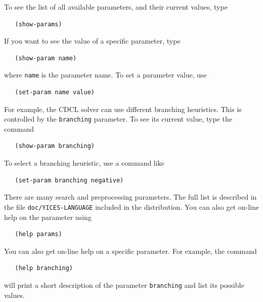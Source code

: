 \documentclass[11pt,twoside,fleqn,openright,titlepage]{cslreport}
\begin{document}
\medskip\noindent
To see the list of all available parameters, and their current values, type
\begin{small}
\begin{verbatim}
   (show-params)
\end{verbatim}
\end{small}
If you want to see the value of a specific parameter, type
\begin{small}
\begin{verbatim}
   (show-param name)
\end{verbatim}
\end{small}
where \texttt{name} is the parameter name. To set a parameter value, use
\begin{small}
\begin{verbatim}
   (set-param name value)
\end{verbatim}
\end{small}
For example, the CDCL solver can use different branching
heuristics. This is controlled by the \texttt{branching} parameter. To
see its current value, type the command
\begin{small}
\begin{verbatim}
   (show-param branching)
\end{verbatim}
\end{small}
To select a branching heuristic, use a command like
\begin{small}
\begin{verbatim}
   (set-param branching negative)
\end{verbatim}
\end{small}

\medskip\noindent
There are many search and preprocessing parameters. The full list is
described in the file \texttt{doc/YICES-LANGUAGE} included in the
distribution. You can also get on-line help on the parameter using
\begin{small}
\begin{verbatim}
   (help params)
\end{verbatim}
\end{small}
You can also get on-line help on a specific parameter. For example,
the command
\begin{small}
\begin{verbatim}
   (help branching)
\end{verbatim}
\end{small}
will print a short description of the parameter \texttt{branching} and
list its possible values.
\end{document}
